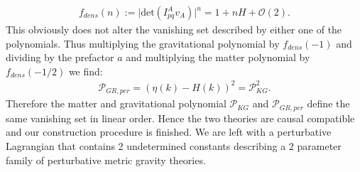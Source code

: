 \documentclass[a4paper,12pt, DIV=14, BCOR=5mm, twoside, headsepline, numbers=noenddot]{scrbook}
\begin{document}
\begin{align}
    f_{dens}(n) := \vert \mathrm{det}\left (I^A_{pq}v_A \right )\vert ^n = 1 + nH + \mathcal{O}(2).
\end{align}
This obviously does not alter the vanishing set described by either one of the polynomials. Thus multiplying the gravitational polynomial by $f_{dens}(-1)$ and dividing by the prefactor $a$ and multiplying the matter polynomial by $f_{dens}(-1/2)$ we find:
\begin{align}
    \mathcal{P}_{GR,per} = (\eta(k)-H(k))^2 = \mathcal{P}_{KG}^2.
\end{align}
Therefore the matter and gravitational polynomial $\mathcal{P}_{KG}$ and $\mathcal{P}_{GR,per}$ define the same vanishing set in linear order.
Hence the two theories are causal compatible and our construction procedure is finished. We are left with a perturbative Lagrangian that contains 2 undetermined constants describing a 2 parameter family of perturbative metric gravity theories.  
\end{document}
